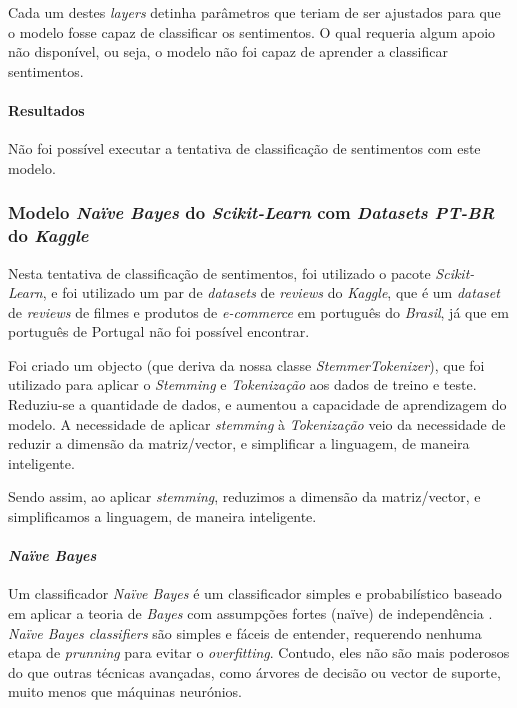 Cada um destes \textit{layers} detinha parâmetros que teriam de ser ajustados para que o modelo fosse capaz de classificar os sentimentos. O qual requeria algum apoio não disponível, ou seja, o modelo não foi capaz de aprender a classificar sentimentos.

\paragraph{Resultados\\}

Não foi possível executar a tentativa de classificação de sentimentos com este modelo.

\subsubsection{Modelo \textit{Naïve Bayes} do \textit{Scikit-Learn} com \textit{Datasets PT-BR} do \textit{Kaggle}}

Nesta tentativa de classificação de sentimentos, foi utilizado o pacote \textit{Scikit-Learn}, e foi utilizado um par de \textit{datasets} de \textit{reviews} do \textit{Kaggle}, que é um \textit{dataset} de \textit{reviews} de filmes e produtos de \textit{e-commerce} em português do \textit{Brasil}, já que em português de Portugal não foi possível encontrar.

Foi criado um objecto (que deriva da nossa classe \textit{StemmerTokenizer}), que foi utilizado para aplicar o \textit{Stemming} e \textit{Tokenização} aos dados de treino e teste. Reduziu-se a quantidade de dados, e aumentou a capacidade de aprendizagem do modelo. A necessidade de aplicar \textit{stemming} à \textit{Tokenização} veio da necessidade de reduzir a dimensão da matriz/vector, e simplificar a linguagem, de maneira inteligente.

Sendo assim, ao aplicar \textit{stemming}, reduzimos a dimensão da matriz/vector, e simplificamos a linguagem, de maneira inteligente.

\paragraph{\textit{Naïve Bayes}\\}

Um classificador \textit{Naïve Bayes} é um classificador simples e probabilístico baseado em aplicar a teoria de \textit{Bayes} com assumpções fortes ({naïve}) de independência \cite{mbn1}. \textit{Naïve Bayes classifiers} são simples e fáceis de entender, requerendo nenhuma etapa de \textit{prunning} para evitar o \textit{overfitting}. Contudo, eles não são mais poderosos do que outras técnicas avançadas, como árvores de decisão ou vector de suporte, muito menos que máquinas neurónios.

